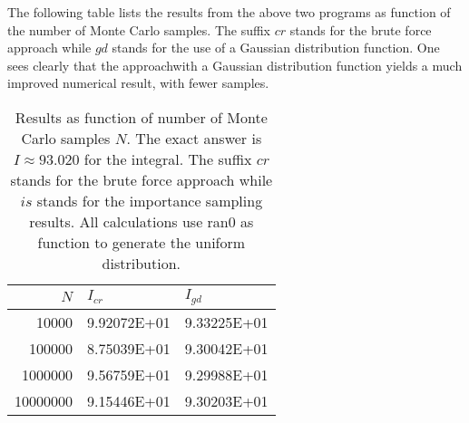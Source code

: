 The following table lists the results from the above two programs 
as function of the number of Monte Carlo samples. The suffix $cr$ stands for the brute force approach 
while $gd$ stands for the use of a Gaussian distribution function. One sees clearly that the approachwith a Gaussian distribution function yields a much improved numerical result, with fewer samples.
\begin{table}[hbtp]
\begin{center}
\caption{Results as function of number of Monte Carlo samples $N$. 
The exact answer is $I\approx 93.020$ for the integral.
The suffix $cr$ stands for the brute force approach 
while $is$ stands for the importance sampling results.
All calculations use ran0 as function to generate the uniform distribution.} 
\begin{tabular}{rll}\hline
$N$&$I_{cr}$&$I_{gd}$\\\hline
10000  & 9.92072E+01 &  9.33225E+01  \\
100000 & 8.75039E+01 &  9.30042E+01 \\
1000000& 9.56759E+01 &  9.29988E+01   \\
10000000& 9.15446E+01 & 9.30203E+01 \\
\hline
\end{tabular} 
\end{center}   
\end{table}     


